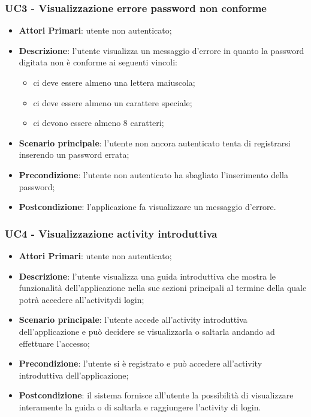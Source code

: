 \subsubsection{UC3 - Visualizzazione errore password non conforme}
\begin{itemize}
	\item \textbf{Attori Primari}: utente non autenticato;
	\item \textbf{Descrizione}: l'utente visualizza un messaggio d'errore in quanto la password digitata non è conforme ai seguenti vincoli:
		\begin{itemize}
			\item ci deve essere almeno una lettera maiuscola;
			\item ci deve essere almeno un carattere speciale;
			\item ci devono essere almeno 8 caratteri;
		\end{itemize}
	\item \textbf{Scenario principale}: l'utente non ancora autenticato tenta di registrarsi inserendo un password errata;
	\item \textbf{Precondizione}: l'utente non autenticato ha sbagliato l'inserimento della password; 
	\item \textbf{Postcondizione}: l'applicazione fa visualizzare un messaggio d'errore.
\end{itemize}

\subsubsection{UC4 - Visualizzazione activity introduttiva}
\begin{itemize}
	\item \textbf{Attori Primari}: utente non autenticato;
	\item \textbf{Descrizione}: l'utente visualizza una guida introduttiva che mostra le funzionalità dell'applicazione nella sue sezioni principali al termine della quale potrà accedere all'activity\glosp di login;
	\item \textbf{Scenario principale}: l'utente accede all'activity introduttiva dell'applicazione e può decidere se visualizzarla o saltarla andando ad effettuare l'accesso;
	\item \textbf{Precondizione}: l'utente si è registrato e può accedere all'activity introduttiva dell'applicazione;
	\item \textbf{Postcondizione}: il sistema fornisce all'utente la possibilità di visualizzare interamente la guida o di saltarla e raggiungere l'activity di login.
\end{itemize}

